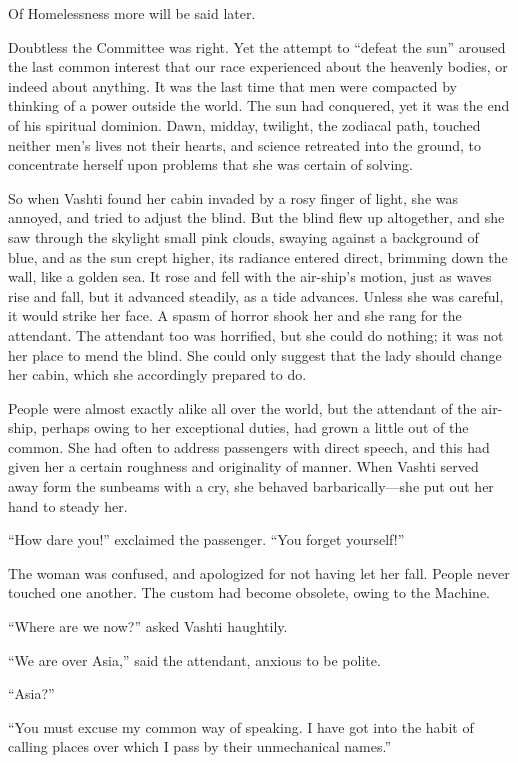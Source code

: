 Of Homelessness more will be said later.

Doubtless the Committee was right. Yet the attempt to ``defeat the sun'' aroused the last common interest that our race experienced about the heavenly bodies, or indeed about anything. It was the last time that men were compacted by thinking of a power outside the world. The sun had conquered, yet it was the end of his spiritual dominion. Dawn, midday, twilight, the zodiacal path, touched neither men's lives not their hearts, and science retreated into the ground, to concentrate herself upon problems that she was certain of solving.

So when Vashti found her cabin invaded by a rosy finger of light, she was annoyed, and tried to adjust the blind. But the blind flew up altogether, and she saw through the skylight small pink clouds, swaying against a background of blue, and as the sun crept higher, its radiance entered direct, brimming down the wall, like a golden sea. It rose and fell with the air-ship's motion, just as waves rise and fall, but it advanced steadily, as a tide advances. Unless she was careful, it would strike her face. A spasm of horror shook her and she rang for the attendant. The attendant too was horrified, but she could do nothing; it was not her place to mend the blind. She could only suggest that the lady should change her cabin, which she accordingly prepared to do.

People were almost exactly alike all over the world, but the attendant of the air-ship, perhaps owing to her exceptional duties, had grown a little out of the common. She had often to address passengers with direct speech, and this had given her a certain roughness and originality of manner. When Vashti served away form the sunbeams with a cry, she behaved barbarically---she put out her hand to steady her.

``How dare you!'' exclaimed the passenger. ``You forget yourself!''

The woman was confused, and apologized for not having let her fall. People never touched one another. The custom had become obsolete, owing to the Machine.

``Where are we now?'' asked Vashti haughtily.

``We are over Asia,'' said the attendant, anxious to be polite.

``Asia?''

``You must excuse my common way of speaking. I have got into the habit of calling places over which I pass by their unmechanical names.''

